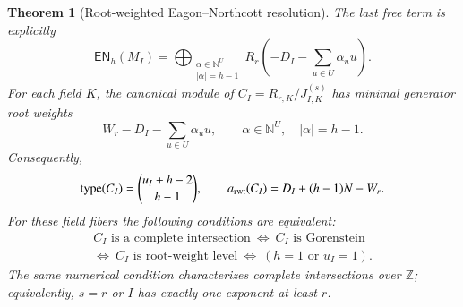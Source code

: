 \documentclass[10pt,fleqn]{article}
\numberwithin{equation}{section}
\newtheorem{theorem}{Theorem}[section]
\begin{document}
\begin{theorem}[Root-weighted Eagon--Northcott resolution]
The last free term is explicitly
\begin{equation}\label{eq:weighted-EN-top}
 \mathsf{EN}_h(M_I)=
 \bigoplus_{\substack{\alpha\in\mathbb N^U\\|\alpha|=h-1}}
 R_r\!\left(-D_I-\sum_{u\in U}\alpha_u u\right).
\end{equation}
For each field $K$, the canonical module of $C_I=R_{r,K}/J_{I,K}^{(s)}$
has minimal generator root weights
\begin{equation}\label{eq:weighted-canonical-generators}
 W_r-D_I-\sum_{u\in U}\alpha_u u,
 \qquad \alpha\in\mathbb N^U,\quad |\alpha|=h-1.
\end{equation}
Consequently,
\begin{equation}\label{eq:weighted-canonical-invariants}
 \operatorname{type}(C_I)=\binom{u_I+h-2}{h-1},\qquad
 a_{\rm rwt}(C_I)=D_I+(h-1)N-W_r.
\end{equation}
For these field fibers the following conditions are equivalent:
\begin{equation}\label{eq:CI-classification}
 \begin{gathered}
 C_I\text{ is a complete intersection}
 \ \Longleftrightarrow\ C_I\text{ is Gorenstein}\\
 \Longleftrightarrow\ C_I\text{ is root-weight level}
 \ \Longleftrightarrow\ (h=1\text{ or }u_I=1).
 \end{gathered}
\end{equation}
The same numerical condition characterizes complete intersections over
$\mathbb Z$; equivalently, $s=r$ or $I$ has exactly one exponent at least $r$.
\end{theorem}
\end{document}
